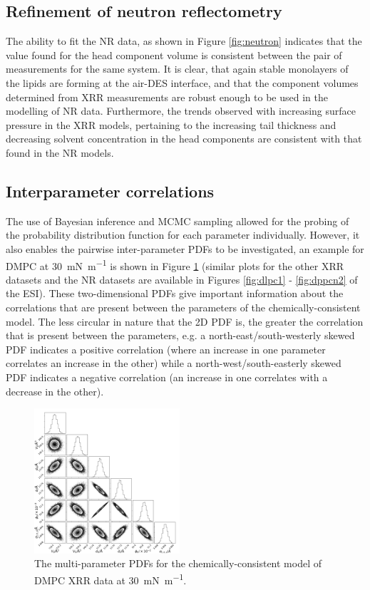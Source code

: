 \documentclass[amsmath,amssymb,twocolumn,superscriptaddress]{revtex4-1}
\begin{document}
\subsection{Refinement of neutron reflectometry}
%
The ability to fit the NR data, as shown in Figure \ref{fig:neutron} indicates that the value found for the head component volume is consistent between the pair of measurements for the same system.
It is clear, that again stable monolayers of the lipids are forming at the air-DES interface, and that the component volumes determined from XRR measurements are robust enough to be used in the modelling of NR data.
Furthermore, the trends observed with increasing surface pressure in the XRR models, pertaining to the increasing tail thickness and decreasing solvent concentration in the head components are consistent with that found in the NR models.

\subsection{Interparameter correlations}
%
The use of Bayesian inference and MCMC sampling allowed for the probing of the probability distribution function for each parameter individually.
However, it also enables the pairwise inter-parameter PDFs to be investigated, an example for DMPC at \SI{30}{\milli\newton\per\meter} is shown in Figure \ref{fig:dmpcpdfs} (similar plots for the other XRR datasets and the NR datasets are available in Figures \ref{fig:dlpc1} - \ref{fig:dppcn2} of the ESI).
These two-dimensional PDFs give important information about the correlations that are present between the parameters of the chemically-consistent model.
The less circular in nature that the 2D PDF is, the greater the correlation that is present between the parameters, e.g. a north-east/south-westerly skewed PDF indicates a positive correlation (where an increase in one parameter correlates an increase in the other) while a north-west/south-easterly skewed PDF indicates a negative correlation (an increase in one correlates with a decrease in the other).
%
\begin{figure}
    \centering
    \includegraphics[width=0.48\textwidth]{figures/dmpc3_all_corner}
    \caption{The multi-parameter PDFs for the chemically-consistent model of DMPC XRR data at \SI{30}{\milli\newton\per\meter}.}
    \label{fig:dmpcpdfs}
\end{figure}
%
\end{document}
